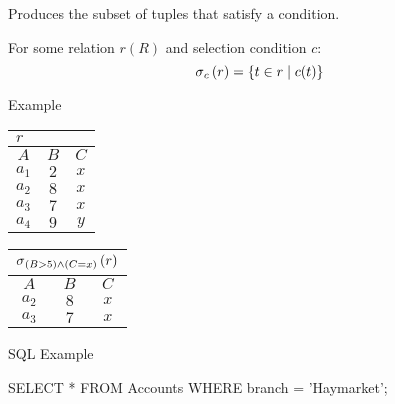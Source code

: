 \begin{multicols}{2}
    
    \begin{CheatsheetEntryFrame}


        Produces the subset of tuples that satisfy a condition.
        
        For some relation $r(R)$ and selection condition $c$:
        \begin{equation*}
            \operatorname{\sigma}_{c}{(r)} = \left\{{t \in r} \mid {c(t)}\right\}
        \end{equation*}

        \SubsectionFrameRemoveSeparation
        \begin{RelAlgSubsection}{Example}
        \begin{center}
            {\footnotesize%
                \begin{tabular}{|ccc|}
                    \multicolumn{3}{l}{\normalsize $r$}
                        \\ \hline
                    \multicolumn{1}{|c}{$A$}
                        & \multicolumn{1}{c}{$B$}
                        & \multicolumn{1}{c|}{$C$}
                        \\ \hline\hline
                    $a_1$ & $2$ & $x$ \\
                    $a_2$ & $8$ & $x$ \\
                    $a_3$ & $7$ & $x$ \\
                    $a_4$ & $9$ & $y$ \\ \hline
                \end{tabular}
                \qquad \qquad
                \begin{tabular}{|ccc|}
                    \multicolumn{3}{l}{\normalsize $\operatorname{\sigma}_{(B>5) \wedge (C=x)}{(r)}$}
                        \\ \hline
                    \multicolumn{1}{|c}{$A$}
                        & \multicolumn{1}{c}{$B$}
                        & \multicolumn{1}{c|}{$C$}
                        \\ \hline\hline
                    $a_2$ & $8$ & $x$ \\
                    $a_3$ & $7$ & $x$ \\ \hline
                \end{tabular}
            }
        \end{center}
        \end{RelAlgSubsection}
        \SubsectionFrameReduceSkip
        \begin{SqlSubsection}{SQL Example}
            \begin{CheatsheetSubsectionLst}
                SELECT *
                FROM Accounts
                WHERE branch = 'Haymarket';
            \end{CheatsheetSubsectionLst}


\end{SqlSubsection}
\end{CheatsheetEntryFrame}
\end{multicols}
